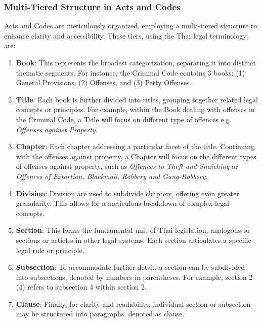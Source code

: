 
\subsubsection{Multi-Tiered Structure in Acts and Codes}
\label{multi-tiered}
Acts and Codes are meticulously organized, employing a multi-tiered structure to enhance clarity and accessibility. These tiers, using the Thai legal terminology, are:

\begin{enumerate}

    \item \textbf{Book}: This represents the broadest categorization, separating it into distinct thematic segments. For instance, the Criminal Code contains 3 books: (1) General Provisions, (2) Offenses, and (3) Petty Offenses.

    \item \textbf{Title}: Each book is further divided into titles, grouping together related legal concepts or principles. For example, within the Book dealing with offenses in the Criminal Code, a Title will focus on different type of offences e.g. \textit{Offenses against Property}.

    \item \textbf{Chapter}: Each chapter addressing a particular facet of the title. Continuing with the offenses against property, a Chapter will focus on the different types of offenses against property, such as \textit{Offences to Theft and Snaiching} or \textit{Offences of Extortion, Blackmail, Robbery and Gang-Robbery}.

    \item \textbf{Division}: Division are used to subdivide chapters, offering even greater granularity. This allows for a meticulous breakdown of complex legal concepts.

    \item \textbf{Section}: This forms the fundamental unit of Thai legislation, analogous to sections or articles in other legal systems. Each section articulates a specific legal rule or principle.

    \item \textbf{Subsection}: To accommodate further detail, a section can be subdivided into subsections, denoted by numbers in parentheses. For example, section 2 (4) refers to subsection 4 within section 2.

    \item \textbf{Clause}: Finally, for clarity and readability, individual section or subsection may be structured into paragraphs, denoted as clause.

\end{enumerate}

